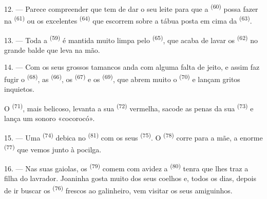 12. --- Parece compreender que tem de dar o seu leite para que a
 \textsuperscript{(60)} possa fazer  na
 \textsuperscript{(61)} ou os excelentes 
\textsuperscript{(64)} que escorrem sobre a tábua posta em cima da
 \textsuperscript{(63)}.

13. --- Toda a  \textsuperscript{(59)} é mantida muito limpa pelo
 \textsuperscript{(65)}, que acaba de lavar os
 \textsuperscript{(62)} no grande balde que leva na mão.

\VUsaut{3.0mm}
\VUsaut{3.0mm}

14. --- Com os seus grossos tamancos anda com alguma falta de jeito, e
assim faz fugir o  \textsuperscript{(68)}, as 
\textsuperscript{(66)}, os  \textsuperscript{(67)} e os 
\textsuperscript{(69)}, que abrem muito o  \textsuperscript{(70)} e lançam
gritos inquietos.

O  \textsuperscript{(71)}, mais belicoso, levanta a sua 
\textsuperscript{(72)} vermelha, sacode as penas da sua 
\textsuperscript{(73)} e lança um sonoro «cocorocó».

15. --- Uma  \textsuperscript{(74)} debica no 
\textsuperscript{(81)} com os seus  \textsuperscript{(75)}. O
 \textsuperscript{(78)} corre para a mãe, a enorme 
\textsuperscript{(77)} que vemos junto à pocilga.

16. --- Nas suas gaiolas, os  \textsuperscript{(79)} comem com
avidez a  \textsuperscript{(80)} tenra que lhes traz a filha do
lavrador. Joaninha gosta muito dos seus coelhos e, todos os dias, depois
de ir buscar os  \textsuperscript{(76)} frescos ao galinheiro, vem
visitar os seus amiguinhos.
\VUsaut{6.0mm}
\VUfilet{22mm}
